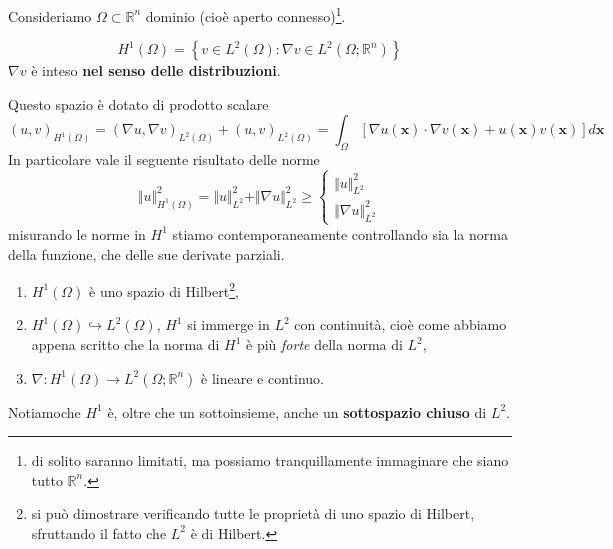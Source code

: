 \documentclass[10pt,a4paper,twoside,openright]{book}
\begin{document}
Consideriamo $\Omega \subset \mathbb{R}^{n}$ dominio (cioè aperto connesso)\footnote{di solito saranno limitati, ma possiamo tranquillamente immaginare che siano tutto $\mathbb{R}^{n}$.}.
\begin{definition}
	\begin{equation*}
		H^{1}( \Omega ) =\left\{v\in L^{2}( \Omega ) :\nabla v\in L^{2}\left( \Omega ;\mathbb{R}^{n}\right)\right\}
	\end{equation*}
	$\nabla v$ è inteso \textbf{nel senso delle distribuzioni}.
\end{definition}
Questo spazio è dotato di prodotto scalare
\begin{equation*}
	( u,v)_{H^{1}( \Omega )} =( \nabla u,\nabla v)_{L^{2}( \Omega )} +( u,v)_{L^{2}( \Omega )} =\int _{\Omega }[ \nabla u(\mathbf{x}) \cdotp \nabla v(\mathbf{x}) +u(\mathbf{x}) v(\mathbf{x})] d\mathbf{x}
\end{equation*}
In particolare vale il seguente risultato delle norme
\begin{equation*}
	\Vert u\Vert ^{2}_{H^{1}( \Omega )} =\Vert u\Vert ^{2}_{L^{2}} +\Vert \nabla u\Vert ^{2}_{L^{2}} \geqslant \begin{cases}
	\Vert u\Vert ^{2}_{L^{2}}\\
	\Vert \nabla u\Vert ^{2}_{L^{2}}
	\end{cases}
\end{equation*}
misurando le norme in $H^{1}$ stiamo contemporaneamente controllando sia la norma della funzione, che delle sue derivate parziali.
\begin{theorem}
	[Microteorema]
	\begin{enumerate}
		\item $H^{1}( \Omega )$ è uno spazio di Hilbert\footnote{si può dimostrare verificando tutte le proprietà di uno spazio di Hilbert, sfruttando il fatto che $L^{2}$ è di Hilbert.},
		\item $H^{1}( \Omega ) \hookrightarrow L^{2}( \Omega )$, $H^{1}$ si immerge in $L^{2}$ con continuità, cioè come abbiamo appena scritto che la norma di $H^{1}$ è più \textit{forte} della norma di $L^{2}$,
		\item $\nabla :H^{1}( \Omega )\rightarrow L^{2}\left( \Omega ;\mathbb{R}^{n}\right)$ è lineare e continuo.
	\end{enumerate}
\end{theorem}

Notiamoche $H^{1}$ è, oltre che un sottoinsieme, anche un \textbf{sottospazio chiuso} di $L^{2}$.
\end{document}
